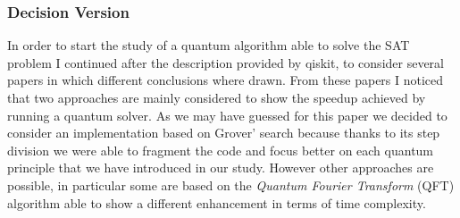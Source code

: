 \documentclass[english]{article}
\begin{document}
			\subsubsection{Decision Version}
			\label{sec:quantumDecisionVersion}
				In order to start the study of a quantum algorithm able to solve the SAT problem I continued after the description provided by qiskit, to consider several papers in which different conclusions where drawn. From these papers I noticed that two approaches are mainly considered to show the speedup achieved by running a quantum solver. As we may have guessed for this paper we decided to consider an implementation based on Grover' search because thanks to its step division we were able to fragment the code and focus better on each quantum principle that we have introduced in our study. However other approaches are possible, in particular some are based on the \emph{Quantum Fourier Transform} (QFT) algorithm able to show a different enhancement in terms of time complexity. \\
				
\end{document}
